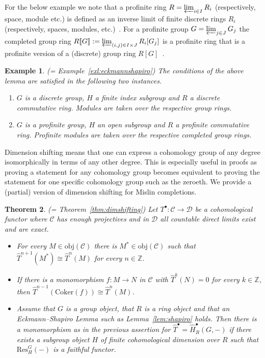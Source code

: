 \documentclass[12pt, a4paper]{article}
\numberwithin{equation}{section}
\newtheorem{thm}{Theorem}[section]
\newtheorem{exl}[thm]{Example}
\theoremstyle{empty}
\theoremstyle{nonumberplain}
\begin{document}
For the below example we note that a profinite ring $R = \varprojlim_{i \in I} R_i$ (respectively, space, module etc.) is defined as an inverse limit of finite discrete rings $R_i$ (respectively, spaces, modules, etc.)~\cite[p.~1]{rib10}. For a profinite group $G = \varprojlim_{j \in J} G_j$ the completed group ring $R{\llbracket}G{\rrbracket} := \varprojlim_{(i, j) \in I \times J} R_i[G_j]$ is a profinite ring that is a profinite version of a (discrete) group ring $R[G]$~\cite[p.~171]{rib10}.

\begin{exl}
(= Example~\ref{exl:eckmannshapiro}) The conditions of the above lemma are satisfied in the following two instances.
\begin{enumerate}
\item $G$ is a discrete group, $H$ a finite index subgroup and $R$ a discrete commutative ring. Modules are taken over the respective group rings.
\item $G$ is a profinite group, $H$ an open subgroup and $R$ a profinite commutative ring. Profinite modules are taken over the respective completed group rings.
\end{enumerate}
\end{exl}

Dimension shifting means that one can express a cohomology group of any degree isomorphically in terms of any other degree. This is especially useful in proofs as proving a statement for any cohomology group becomes equivalent to proving the statement for one specific cohomology group such as the zeroeth. We provide a (partial) version of dimension shifting for Mislin completions.

\begin{thm}
(= Theorem~\ref{thm:dimshifting}) Let $T^{\bullet}: \mathcal{C} \rightarrow \mathcal{D}$ be a cohomological functor where $\mathcal{C}$ has enough projectives and in $\mathcal{D}$ all countable direct limits exist and are exact.
\begin{itemize}
\item For every $M \in \mathrm{obj}(\mathcal{C})$ there is $M^{\ast} \in \mathrm{obj}(\mathcal{C})$ such that $\widehat{T}^{n+1}(M^{\ast}) \cong \widehat{T}^n(M)$ for every $n \in \mathbb{Z}$.
\item If there is a monomorphism $f: M \rightarrow N$ in $\mathcal{C}$ with $\widehat{T}^k(N) = 0$ for every $k \in \mathbb{Z}$, then $\widehat{T}^{n-1}(\mathrm{Coker}(f)) \cong \widehat{T}^n(M)$.
\item Assume that $G$ is a group object, that $R$ is a ring object and that an Eckmann--Shapiro Lemma such as Lemma~\ref{lem:shapiro} holds. Then there is a monomorphism as in the previous assertion for $\widehat{T}^{\bullet} = \widehat{H}_R^{\bullet}(G, -)$ if there exists a subgroup object $H$ of finite cohomological dimension over $R$ such that $\mathrm{Res}_H^G(-)$ is a faithful functor.
\end{itemize}
\end{thm}
\end{document}
